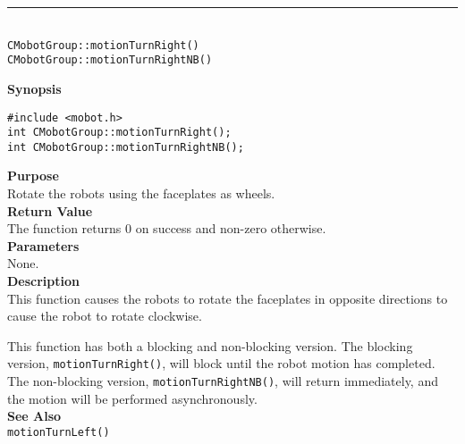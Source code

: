 \noindent
\vspace{5pt}
\rule{4.5in}{0.015in}\\
\noindent
{\LARGE \texttt{CMobotGroup::motionTurnRight()}}\\
{\LARGE \texttt{CMobotGroup::motionTurnRightNB()}}\\
{}

\noindent
{\bf Synopsis}\\
\begin{verbatim}
#include <mobot.h>
int CMobotGroup::motionTurnRight();
int CMobotGroup::motionTurnRightNB();
\end{verbatim}

\noindent
{\bf Purpose}\\
Rotate the robots using the faceplates as wheels.\\

\noindent
{\bf Return Value}\\
The function returns 0 on success and non-zero otherwise.\\

\noindent
{\bf Parameters}\\
None.\\

\noindent
{\bf Description}\\
This function causes the robots to rotate the faceplates in opposite directions
to cause the robot to rotate clockwise.

This function has both a blocking and non-blocking version.
The blocking version, \texttt{motionTurnRight()}, will block until the
robot motion has completed. The non-blocking version, \texttt{motionTurnRightNB()},
will return immediately, and the motion will be performed asynchronously.\\

\noindent
{\bf See Also}\\
\texttt{motionTurnLeft()}

